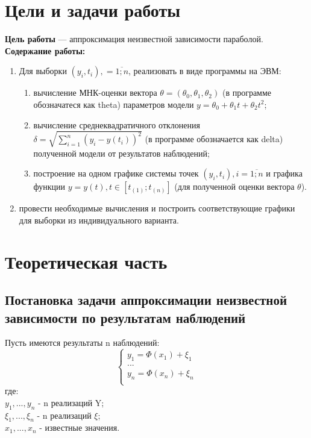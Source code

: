 \chapter{Цели и задачи работы}
\textbf{Цель работы} --- аппроксимация неизвестной зависимости параболой.
\textbf{Содержание работы:}
\begin{enumerate}
\item Для выборки $(y_i, t_i),  = \overline{1; n}$, реализовать в виде программы на ЭВМ:
\begin{enumerate}
\item вычисление МНК-оценки вектора $\theta = (\theta_0, \theta_1, \theta_2)$ (в программе обозначатеся как theta) параметров модели $y = \theta_0 + \theta_1 t + \theta_2 t^2$;
\item вычисление среднеквадратичного отклонения $\delta = \sqrt{\sum\limits^n_{i=1} (y_i - y(t_i))^2}$ (в программе обозначается как delta) полученной модели от результатов наблюдений;
\item построение на одном графике системы точек $(y_i, t_i), i = \overline{1;n}$ и графика функции $y = y(t), t \in [t_{(1)}; t_{(n)}]$ (для полученной оценки вектора $\theta$).
\end{enumerate}
\item провести необходимые вычисления и построить соответствующие графики для выборки из индивидуального варианта.
\end{enumerate}

\chapter{Теоретическая часть}
\section{Постановка задачи аппроксимации неизвестной зависимости по результатам наблюдений}
Пусть имеются результаты n наблюдений:\\
\begin{equation}
\begin{cases}
y_1 = \Phi(x_1) + \xi_1\\
...\\
y_n = \Phi(x_n) + \xi_n\\
\end{cases}
\end{equation}
где:\\
$y_1, ..., y_n$ - n реализаций Y;\\
$\xi_1, ..., \xi_n$ - n реализаций $\xi$;\\
$x_1, ..., x_n$ - известные значения.\\

